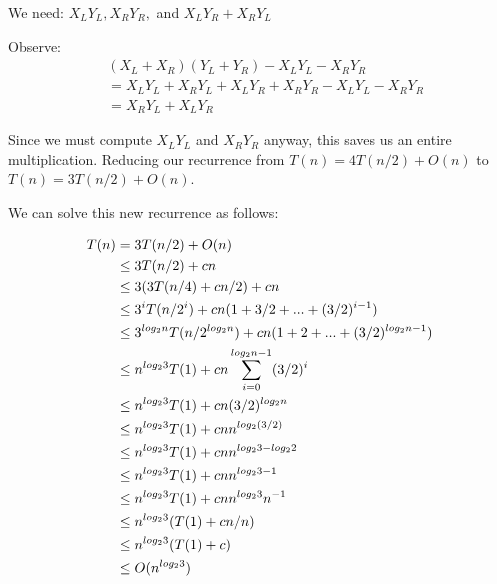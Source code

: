 We need: $X_LY_L, X_RY_R,$ and $X_LY_R + X_RY_L$

Observe: 
%
\begin{align*}
&(X_L + X_R)(Y_L + Y_R) - X_LY_L - X_RY_R \\
&= X_LY_L + X_RY_L + X_LY_R + X_RY_R - X_LY_L - X_RY_R \\
&= X_RY_L + X_LY_R
\end{align*}

Since we must compute $X_LY_L$ and $X_RY_R$ anyway, this saves us an
entire multiplication.  Reducing our recurrence from $T(n) = 4T(n/2) +
O(n)$ to $T(n) = 3T(n/2) + O(n)$.

We can solve this new recurrence as follows:

\begin{align*}
T(n)
&= 3T(n/2) + O(n) \\
&\leq 3T(n/2) + cn \\
&\leq 3(3T(n/4) + cn/2) + cn \\
&\leq 3^iT(n/2^i) + cn(1 + 3/2 + ... + (3/2)^{i-1}) \\
&\leq 3^{log_2n}T(n/2^{log_2n}) + cn(1 + 2 + ... + (3/2)^{log_2n-1}) \\
&\leq n^{log_23}T(1) + cn \displaystyle\sum\limits_{i=0}^{log_2n-1} (3/2)^i \\
&\leq n^{log_23}T(1) + cn (3/2)^{log_2n} \\
&\leq n^{log_23}T(1) + cn n^{log_2(3/2)} \\
&\leq n^{log_23}T(1) + cn n^{log_23 - log_22} \\
&\leq n^{log_23}T(1) + cn n^{log_23 - 1} \\
&\leq n^{log_23}T(1) + cn n^{log_23}n^{-1} \\
&\leq n^{log_23}(T(1) + cn/n) \\
&\leq n^{log_23}(T(1) + c) \\
&\leq O(n^{log_23})
\end{align*}
